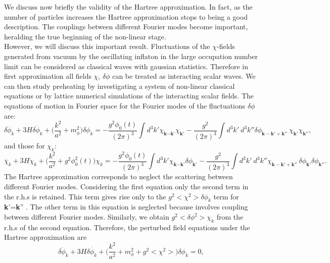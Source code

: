 \documentclass[11pt,a4paper,twoside]{book}
\begin{document}
 We discuss now briefly the validity of the Hartree approximation. In fact, as the number of particles increases the Hartree approximation stops to  being a good description. The couplings between different Fourier modes become important, heralding the true beginning of the non-linear stage. \\
However, we will discuss this important result. Fluctuations of the $\chi$-fields generated from vacuum by the oscillating inflaton in the large occupation number limit can be considered as classical waves with gaussian statistics. Therefore in first approximation all fields $\chi$, $\delta \phi$ can be treated as interacting scalar waves. We can then study preheating by investigating  a system of non-linear classical equations or by lattice numerical simulations of the interacting scalar fields. The equations of motion in Fourier space for the Fourier modes of the fluctuations $\delta \phi$ are:
\begin{equation}
\label{Chap4:Backreaction_EquationDeltaPhi}
\ddot{\delta \phi_{k}} + 3H\delta \dot{\phi}_{k} + \Bigg(\frac{k^{2}}{a^{2}} + m^{2}_{\phi}\Bigg)\delta \phi_{k}
=-\frac{g^{2}\phi_{0}(t)}{(2\pi)^{3}} \int d^{3}k' \chi_{\textbf{k} - \textbf{k'}}\chi_{\textbf{k}'} - \frac{g^{2}}{(2\pi)^{3}}\int d^{3}k'\ d^{3} k'' \delta\phi_{\textbf{k}-\textbf{k}' + \textbf{k}''}\ \chi_{\textbf{k}'}\chi_{\textbf{k}''},
\end{equation}
and those for $ \chi_{k} $:
\begin{equation}
\label{Chap4:Backreaction_EquationChi}
\ddot{\chi_{k}} + 3H\dot{\chi}_{k} + \Bigg(\frac{k^{2}}{a^{2}} + g^{2}\phi_{0}^{2}(t)\Bigg)\chi_{k}
=-\frac{g^{2}\phi_{0}(t)}{(2\pi)^{3}} \int d^{3}k' \chi_{\textbf{k} - \textbf{k'}}\delta\phi_{\textbf{k}'} - \frac{g^{2}}{(2\pi)^{3}}\int d^{3}k'\ d^{3} k''\chi_{\textbf{k}-\textbf{k}' + \textbf{k}''}\ \delta\phi_{\textbf{k}'}\delta\phi_{\textbf{k}''}.
\end{equation}
 The Hartree approximation corresponds to neglect the scattering between different Fourier modes. Considering the first equation only the second term in the r.h.s is retained. This term gives rise only to the  $ g^{2}<\chi^{2}>\delta\phi_{k} $ term for \textbf{k}'=\textbf{k}'' . The other term in this equation is neglected because involves coupling between different Fourier modes. Similarly, we obtain $ g^{2}<\delta \phi^{2}>\chi_{k} $ from the r.h.s of the second equation. Therefore, the perturbed field equations under the Hartree approximation
 are
 \begin{equation}
\label{Chap4:Backreaction_deltaPhiHartree}
\ddot{\delta \phi_{k}} + 3H\delta \dot{\phi_{k}} + \Bigg(\frac{k^{2}}{a^{2}} + m^{2}_{\phi} + g^{2}<\chi^{2}>\Bigg)\delta\phi_{k} = 0,
 \end{equation}
\end{document}
